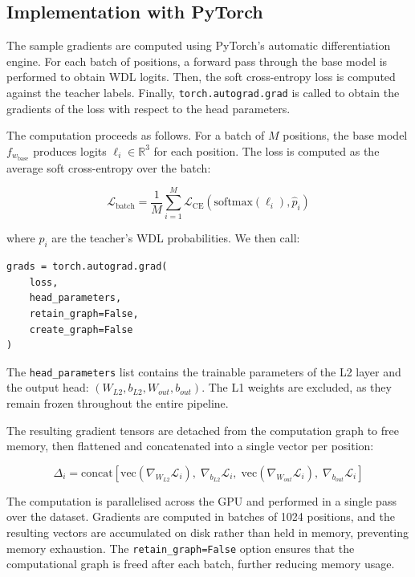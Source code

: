 \subsection{Implementation with PyTorch}

The sample gradients are computed using PyTorch's automatic differentiation engine. For each batch of positions, a forward pass through the base model is performed to obtain WDL logits. Then, the soft cross-entropy loss is computed against the teacher labels. Finally, \texttt{torch.autograd.grad} is called to obtain the gradients of the loss with respect to the head parameters.

The computation proceeds as follows. For a batch of $M$ positions, the base model $f_{w_{\text{base}}}$ produces logits $\ell_i \in \mathbb{R}^3$ for each position. The loss is computed as the average soft cross-entropy over the batch:

\[
\mathcal{L}_{\text{batch}} = \frac{1}{M} \sum_{i=1}^M \mathcal{L}_{\text{CE}}(\text{softmax}(\ell_i), \hat{p}_i)
\]

where $\hat{p}_i$ are the teacher's WDL probabilities. We then call:

\begin{lstlisting}
grads = torch.autograd.grad(
    loss,
    head_parameters,
    retain_graph=False,
    create_graph=False
)
\end{lstlisting}

The \texttt{head\_parameters} list contains the trainable parameters of the L2 layer and the output head: $(W_{L2}, b_{L2}, W_{out}, b_{out})$. The L1 weights are excluded, as they remain frozen throughout the entire pipeline.

The resulting gradient tensors are detached from the computation graph to free memory, then flattened and concatenated into a single vector per position:

\[
\Delta_i = \text{concat}\left[\text{vec}(\nabla_{W_{L2}} \mathcal{L}_i),\; \nabla_{b_{L2}} \mathcal{L}_i,\; \text{vec}(\nabla_{W_{out}} \mathcal{L}_i),\; \nabla_{b_{out}} \mathcal{L}_i\right]
\]

The computation is parallelised across the GPU and performed in a single pass over the dataset. Gradients are computed in batches of 1024 positions, and the resulting vectors are accumulated on disk rather than held in memory, preventing memory exhaustion. The \texttt{retain\_graph=False} option ensures that the computational graph is freed after each batch, further reducing memory usage.

